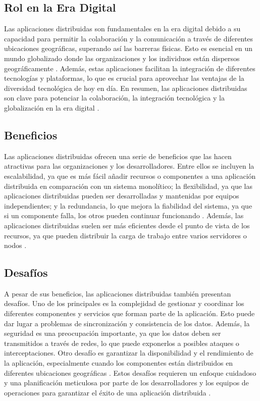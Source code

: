 \subsection{Rol en la Era Digital}
\noindent
Las aplicaciones distribuidas son fundamentales en la era digital debido a su capacidad para permitir la colaboración y la comunicación a través de diferentes ubicaciones geográficas, superando así las barreras físicas. Esto es esencial en un mundo globalizado donde las organizaciones y los individuos están dispersos geográficamente \cite{Zeng2012distributed}. Además, estas aplicaciones facilitan la integración de diferentes tecnologías y plataformas, lo que es crucial para aprovechar las ventajas de la diversidad tecnológica de hoy en día. En resumen, las aplicaciones distribuidas son clave para potenciar la colaboración, la integración tecnológica y la globalización en la era digital \cite{Sin2021digital}.

\subsection{Beneficios}
\noindent
Las aplicaciones distribuidas ofrecen una serie de beneficios que las hacen atractivas para las organizaciones y los desarrolladores. Entre ellos se incluyen la escalabilidad, ya que es más fácil añadir recursos o componentes a una aplicación distribuida en comparación con un sistema monolítico; la flexibilidad, ya que las aplicaciones distribuidas pueden ser desarrolladas y mantenidas por equipos independientes; y la redundancia, lo que mejora la fiabilidad del sistema, ya que si un componente falla, los otros pueden continuar funcionando \cite{SomoskHoi2019airline}. Además, las aplicaciones distribuidas suelen ser más eficientes desde el punto de vista de los recursos, ya que pueden distribuir la carga de trabajo entre varios servidores o nodos \cite{Francisco2021,Ghosh2020}.

\subsection{Desafíos}
\noindent
A pesar de sus beneficios, las aplicaciones distribuidas también presentan desafíos. Uno de los principales es la complejidad de gestionar y coordinar los diferentes componentes y servicios que forman parte de la aplicación. Esto puede dar lugar a problemas de sincronización y consistencia de los datos. Además, la seguridad es una preocupación importante, ya que los datos deben ser transmitidos a través de redes, lo que puede exponerlos a posibles ataques o interceptaciones. Otro desafío es garantizar la disponibilidad y el rendimiento de la aplicación, especialmente cuando los componentes están distribuidos en diferentes ubicaciones geográficas \cite{Zeng2012distributed}. Estos desafíos requieren un enfoque cuidadoso y una planificación meticulosa por parte de los desarrolladores y los equipos de operaciones para garantizar el éxito de una aplicación distribuida \cite{SomoskHoi2019airline}.

